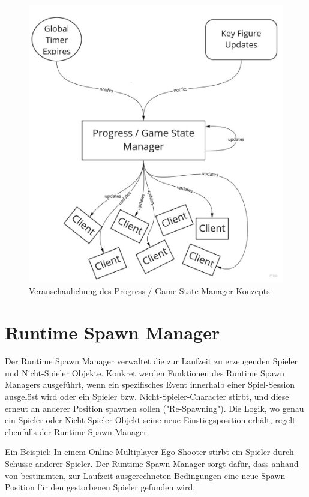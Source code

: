 \begin{figure}
	\centering
	\includegraphics[width=150mm]{images/Progress_State_Manager.jpg}
	\caption[Progress / Game-State Manager]{Veranschaulichung des Progress / Game-State Manager Konzepts}
	\label{pic:Progress_State_Manager}
\end{figure}

\section{Runtime Spawn Manager}

Der Runtime Spawn Manager verwaltet die zur Laufzeit zu erzeugenden Spieler und Nicht-Spieler Objekte. Konkret werden Funktionen des Runtime Spawn Managers ausgeführt, wenn ein spezifisches Event innerhalb einer Spiel-Session ausgelöst wird oder ein Spieler bzw. Nicht-Spieler-Character stirbt, und diese erneut an anderer Position spawnen sollen ("Re-Spawning"). Die Logik, wo genau ein Spieler oder Nicht-Spieler Objekt seine neue Einstiegsposition erhält, regelt ebenfalls der Runtime Spawn-Manager.

Ein Beispiel: In einem Online Multiplayer Ego-Shooter \cite{Wikipedia.2021g} stirbt ein Spieler durch Schüsse anderer Spieler. Der Runtime Spawn Manager sorgt dafür, dass anhand von bestimmten, zur Laufzeit ausgerechneten Bedingungen eine neue Spawn-Position für den gestorbenen Spieler gefunden wird. 

